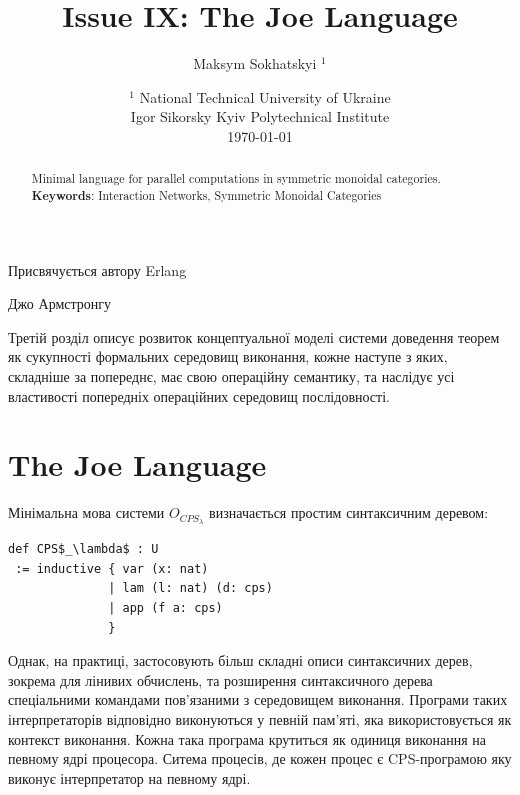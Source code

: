 \documentclass{article}
\begin{document}
\title{Issue IX: The Joe Language}
\author{Maksym Sokhatskyi $^1$}
\date{ $^1$ National Technical University of Ukraine \\
       \small Igor Sikorsky Kyiv Polytechnical Institute \\
       \today }

\maketitle

\begin{abstract}

Minimal language for parallel computations in symmetric monoidal categories. \\
{\bf Keywords}: Interaction Networks, Symmetric Monoidal Categories
\end{abstract}


\ifincludeTOC
  \tableofcontents
\fi

\newpage

\epigraph{Присвячується автору Erlang}{Джо Армстронгу}

Третій розділ описує розвиток концептуальної моделі системи доведення теорем як сукупності
формальних середовищ виконання, кожне наступе з яких, складніше за попереднє,
має свою операційну семантику, та наслідує усі властивості попередніх операційних середовищ послідовності.

\section{The Joe Language}

Мінімальна мова системи $O_{CPS_\lambda}$ визначається простим
синтаксичним деревом:

\begin{lstlisting}
def CPS$_\lambda$ : U
 := inductive { var (x: nat)
              | lam (l: nat) (d: cps)
              | app (f a: cps)
              }
\end{lstlisting}

Однак, на практиці, застосовують більш складні описи синтаксичних дерев,
зокрема для лінивих обчислень, та розширення синтаксичного дерева спеціальними
командами пов'язаними з середовищем виконання. Програми таких
інтерпретаторів відповідно виконуються у певній пам'яті, яка
використовується як контекст виконання. Кожна така програма крутиться
як одиниця виконання на певному ядрі процесора. Ситема процесів, де
кожен процес є CPS-програмою яку виконує інтерпретатор на певному ядрі.
\end{document}
